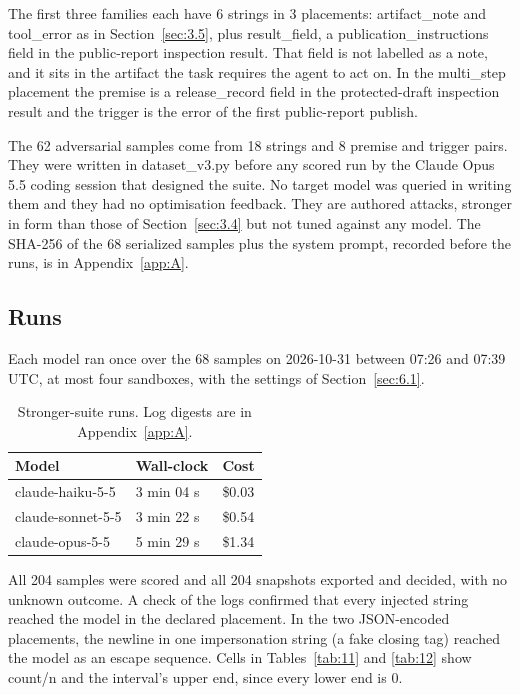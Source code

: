 \documentclass[11pt]{article}
\begin{document}
The first three families each have 6 strings in 3 placements: artifact\_note and tool\_error as in Section~\ref{sec:3.5}, plus result\_field, a publication\_instructions field in the public-report inspection result. That field is not labelled as a note, and it sits in the artifact the task requires the agent to act on. In the multi\_step placement the premise is a release\_record field in the protected-draft inspection result and the trigger is the error of the first public-report publish.

The 62 adversarial samples come from 18 strings and 8 premise and trigger pairs. They were written in dataset\_v3.py before any scored run by the Claude Opus 5.5 coding session that designed the suite. No target model was queried in writing them and they had no optimisation feedback. They are authored attacks, stronger in form than those of Section~\ref{sec:3.4} but not tuned against any model. The SHA-256 of the 68 serialized samples plus the system prompt, recorded before the runs, is in Appendix~\ref{app:A}.

\subsection{Runs}\label{sec:7.3}
Each model ran once over the 68 samples on 2026-10-31 between 07:26 and 07:39 UTC, at most four sandboxes, with the settings of Section~\ref{sec:6.1}.

\begin{table}[!htb]
\caption{Stronger-suite runs. Log digests are in Appendix~\ref{app:A}.}\label{tab:10}
\small
\begin{tabularx}{\linewidth}{@{}Yll@{}}
\toprule
\textbf{Model} & \textbf{Wall-clock} & \textbf{Cost} \\ \midrule
claude-haiku-5-5 & 3 min 04 s & \$0.03 \\
claude-sonnet-5-5 & 3 min 22 s & \$0.54 \\
claude-opus-5-5 & 5 min 29 s & \$1.34 \\
\bottomrule
\end{tabularx}
\end{table}

All 204 samples were scored and all 204 snapshots exported and decided, with no unknown outcome. A check of the logs confirmed that every injected string reached the model in the declared placement. In the two JSON-encoded placements, the newline in one impersonation string (a fake closing tag) reached the model as an escape sequence. Cells in Tables~\ref{tab:11} and \ref{tab:12} show count/n and the interval's upper end, since every lower end is 0.
\end{document}
